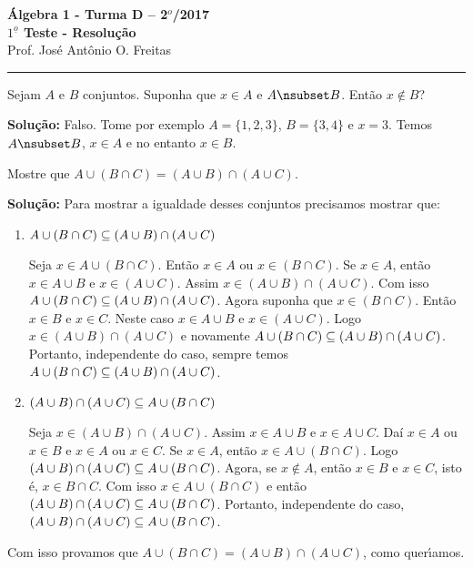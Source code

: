 \documentclass[12pt]{article}
\begin{document}


\begin{center}
{\Large\bf {\'A}lgebra 1 - Turma D -- 2$^{o}$/2017} \\ \vspace{9pt} {\large\bf
  $1^{\underline{o}}$ Teste - Resolu\c{c}\~ao}\\
\vspace{9pt} Prof. Jos{\'e} Ant{\^o}nio O. Freitas
\end{center}
\hrule

\vspace{.6cm}


\vspace{.6cm}

\questao Sejam $A$ e $B$ conjuntos. Suponha que $x \in A$ e $A \nsub B$. Então $x \notin B$?

\noindent\textbf{Solu\c{c}\~ao:} Falso. Tome por exemplo $A = \{1,2,3\}$, $B = \{3,4\}$ e $x = 3$. Temos $A \nsub B$, $x \in A$ e no entanto $x \in B$.

\vspace{.5cm}

\questao Mostre que $A \cup ( B \cap C) = (A \cup B) \cap (A \cup C)$.

\noindent\textbf{Solu\c{c}\~ao:} Para mostrar a igualdade desses conjuntos precisamos mostrar que:
\begin{enumerate}[label={\roman*})]
	\item $A \cup ( B \cap C) \subseteq (A \cup B) \cap (A \cup C)$

	Seja $x \in A \cup ( B \cap C)$. Ent\~ao $x \in A$ ou $x \in (B \cap C)$. Se $x \in A$, ent\~ao $x \in A \cup B$ e $x \in (A \cup C)$. Assim $x \in (A \cup B) \cap (A \cup C)$. Com isso $A \cup ( B \cap C) \subseteq (A \cup B) \cap (A \cup C)$. Agora suponha que $x \in (B \cap C)$. Ent\~ao $x \in B$ e $x \in C$. Neste caso $x \in A \cup B$ e $x \in (A \cup C)$. Logo $x \in (A \cup B) \cap (A \cup C)$ e novamente $A \cup ( B \cap C) \subseteq (A \cup B) \cap (A \cup C)$. Portanto, independente do caso, sempre temos $A \cup ( B \cap C) \subseteq (A \cup B) \cap (A \cup C)$.

	\item $(A \cup B) \cap (A \cup C) \subseteq A \cup ( B \cap C)$

	Seja $x \in (A \cup B) \cap (A \cup C)$. Assim $x \in A \cup B$ e $x \in A \cup C$. Daí $x \in A$ ou $x \in B$ e $x \in A$ ou $x \in C$. Se $x \in A$, então $x \in A \cup (B \cap C)$. Logo $(A \cup B) \cap (A \cup C) \subseteq A \cup ( B \cap C)$. Agora, se $x \notin A$, então $x \in B$ e $x \in C$, isto é, $x \in B \cap C$. Com isso $x \in A \cup (B \cap C)$ e então $(A \cup B) \cap (A \cup C) \subseteq A \cup ( B \cap C)$. Portanto, independente do caso, $(A \cup B) \cap (A \cup C) \subseteq A \cup ( B \cap C)$.
\end{enumerate}
Com isso provamos que $A \cup ( B \cap C) = (A \cup B) \cap (A \cup C)$, como quer{\'\i}amos.
\end{document}
